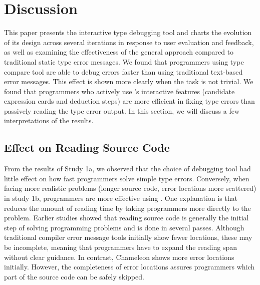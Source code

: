 \section{Discussion}


This paper presents the interactive type debugging tool \chameleon{} and charts the evolution of its design across several iterations in response to user evaluation and feedback, as well as examining the effectiveness of the general approach compared to traditional static type error messages. We found that programmers using \chameleon{} type compare tool are able to debug errors faster than using traditional text-based error messages. This effect is shown more clearly when the task is not trivial. We found that programmers who actively use \chameleon{}'s interactive features (candidate expression cards and deduction steps) are more efficient in fixing type errors than passively reading the type error output. In this section, we will discuss a few interpretations of the results.


\subsection{Effect on Reading Source Code}
From the results of Study 1a, we observed that the choice of debugging tool had little effect on how fast programmers solve simple type errors. Conversely, when facing more realistic problems (longer source code, error locations more scattered) in study 1b, programmers are more effective using \chameleon{}. One explanation is that \chameleon{} reduces the amount of reading time by taking programmers more directly to the problem. Earlier studies \cite{jbara_how_2015, peitek_what_2020} showed that reading source code is generally the initial step of solving programming problems and is done in several passes. Although traditional compiler error message tools initially show fewer locations, these may be incomplete, meaning that programmers have to expand the reading span without clear guidance. In contrast, Chameleon shows more error locations initially. However, the completeness of error locations assures programmers which part of the source code can be safely skipped.

